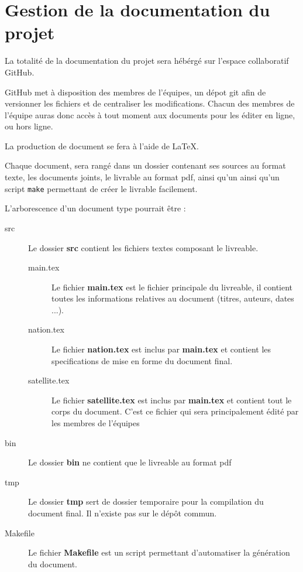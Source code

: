 \section{Gestion de la documentation du projet}

La totalité de la documentation du projet sera hébérgé sur l'espace collaboratif GitHub.

GitHub met à disposition des membres de l'équipes, un dépot git afin de versionner les fichiers et de centraliser les modifications.
Chacun des membres de l’équipe auras donc accès à tout moment aux documents pour les éditer en ligne, ou hors ligne.

La production de document se fera à l’aide de LaTeX.

Chaque document, sera rangé dans un dossier contenant ses sources au format texte, les documents joints, le livrable au format pdf, ainsi qu'un  ainsi qu'un script \texttt{make} permettant de créer le livrable facilement.

L'arborescence d'un document type pourrait être :
\begin{description}
    \item[src]{Le dossier {\bf src} contient les fichiers textes composant le livreable.}
    \begin{description}
        \item[main.tex]{Le fichier {\bf main.tex} est le fichier principale du livreable, il contient toutes les informations relatives au document (titres, auteurs, dates ...).}
        \item[nation.tex] {Le fichier {\bf nation.tex} est inclus par {\bf main.tex} et contient les specifications de mise en forme du document final.}
        \item[satellite.tex] {Le fichier {\bf satellite.tex} est inclus par {\bf main.tex} et contient tout le corps du document. C'est ce fichier qui sera principalement édité par les membres de l'équipes}
    \end{description}
    \item [bin]{Le dossier {\bf bin} ne contient que le livreable au format pdf}
    \item [tmp]{Le dossier {\bf tmp} sert de dossier temporaire pour la compilation du document final. Il n'existe pas sur le dépôt commun.}
    \item [Makefile]{Le fichier {\bf Makefile} est un script permettant d'automatiser la génération du document.}
\end{description}

